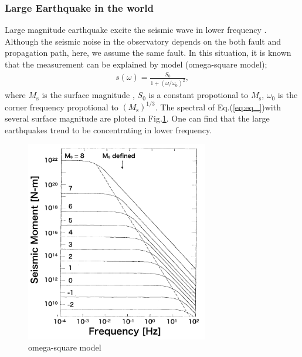 \subsubsection{Large Earthquake in the world}
Large magnitude earthquake excite the seismic wave in lower frequency \cite{aki2002quantitative,aki1967scaling}. Although the seismic noise in the observatory depends on the both fault and propagation path, here, we assume the same fault. In this situation, it is known that the measurement can be explained by model (omega-square model);
\begin{eqnarray}
  s(\omega) = \displaystyle\frac{S_0}{1+({\omega}/{\omega_0})^2}, \label{eq:eq_}
\end{eqnarray}
where $M_{\mathrm{s}}$ is the surface magnitude \cite{gutenberg1945study}, $S_0$ is a constant propotional to $M_{\mathrm{s}}$, $\omega_0$ is the corner frequency propotional to $(M_{\mathrm{s}})^{1/3}$. The spectral of Eq.(\ref{eq:eq_})with several surface magnitude are ploted in Fig.\ref{img:img328}. One can find that the large earthquakes trend to be concentrating in lower frequency.

\begin{figure}[h]
  \begin{center}   
    \includegraphics[width=8cm]{./img_chap3/img328.png}
    \caption{omega-square model \cite{aki1967scaling}}\label{img:img328}
  \end{center}
\end{figure}


\newpage
